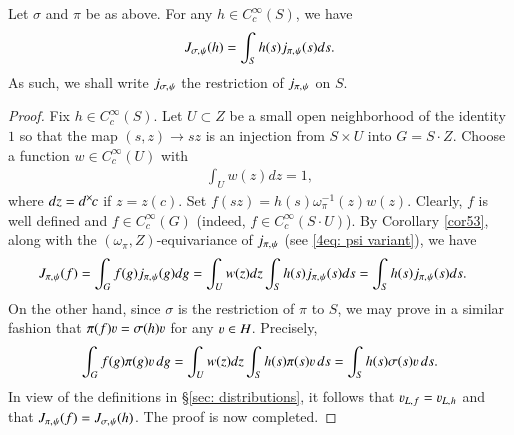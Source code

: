 \documentclass{amsproc}
\newcommand{\BC}{{\mathbb {C}}} \newcommand{\BD}{{\mathbb {D}}}
\newcommand{\ra}{\rightarrow}
\def\-{^{-1}}
\def\lp {\left (}
\def\rp {\right )}
\def\BCx{\BC^{\times}}
\def\shskip{\hskip 0.5 pt}
\def\tw{\textit{w}}
\def\dx{d^{\times} \hskip -1 pt}
\theoremstyle{plain}
\numberwithin{equation}{section}
\begin{document}
    \begin{prop}\label{prop54: regularity of J on S}	
    Let $\sigma $ and $\pi$ be as above.  For any $h\in C_c^\infty(S)$, we have
    \[
    J_{\sigma,\shskip \psi}(h)=\int_S h(s) j_{\pi,\shskip \psi}(s) ds.
    \]
    As such, we shall write $j_{\sigma, \shskip \psi} $ the restriction of $j_{\pi,\shskip \psi}$ on $S$.
    \end{prop}
   \begin{proof} %
   Fix $h\in C_c^\infty(S)$. Let  $U \subset Z$ be a small open neighborhood of the identity  $1$ so that the map $ (s, z) \ra s z $ is an injection from $S \times U$ into $G = S \cdot Z$. %
   Choose a function $\tw \in C_c^{\infty} (U)$ with
   \begin{align*}
  \int_{U} \tw(z) d  z = 1,
   \end{align*}
   where $d z = \dx  c$ if $z = z(c)$.
   Set $f (s z) = h (s) \omega_{\pi}\- (z) \tw (z) $.
Clearly, $f$ is well defined and $f \in C_c^{\infty} (G)$ (indeed, $f \in C_c^{\infty} (S \cdot U)$).
   By Corollary \ref{cor53}, along with the  $(\omega_{\pi}, Z)$-equivariance of $j_{\pi, \shskip \psi}$ (see \eqref{4eq: psi variant}), we have
   \begin{align*}
    J_{\pi,\shskip \psi}(  f)&=\int_G  f(g) j_{\pi,\shskip \psi}(g) dg  =    \int_{U} \tw(z)d  z \int_Sh(s) j_{\pi,\shskip \psi}(s)ds     = \int_S h(s) j_{\pi,\shskip \psi}(s)ds.
   \end{align*}
   On the other hand, since $\sigma$ is the restriction of $\pi$ to $S$,    we may prove  in a similar fashion that $\pi (f) \varv = \sigma (h) \varv$ for any $\varv \in H$. Precisely,
   \begin{align*}
   \int_G f(g)\pi(g)\varv \,  dg   = \int_{U } \tw(z)d  z \int_S h(s) \pi(s)\varv \,  ds
   =  \int_S h(s) \sigma (s)\varv \,  ds.
   \end{align*}
   In view of the definitions in \S \ref{sec: distributions}, it   follows that $\varv_{L, \shskip f}=\varv_{L,\shskip h}$ and that $J_{\pi,\shskip \psi}(f)=J_{\sigma,\shskip \psi}(h)$. The proof is now completed.
   \end{proof}
\end{document}
